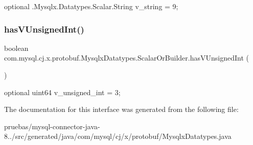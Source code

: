 {\ttfamily optional .Mysqlx.\+Datatypes.\+Scalar.\+String v\+\_\+string = 9;} \mbox{\label{interfacecom_1_1mysql_1_1cj_1_1x_1_1protobuf_1_1_mysqlx_datatypes_1_1_scalar_or_builder_a90769b1f811e80e2769df5e7c6b87221}} 
\subsubsection{\texorpdfstring{has\+V\+Unsigned\+Int()}{hasVUnsignedInt()}}
{\footnotesize\ttfamily boolean com.\+mysql.\+cj.\+x.\+protobuf.\+Mysqlx\+Datatypes.\+Scalar\+Or\+Builder.\+has\+V\+Unsigned\+Int (\begin{DoxyParamCaption}{ }\end{DoxyParamCaption})}

{\ttfamily optional uint64 v\+\_\+unsigned\+\_\+int = 3;} 

The documentation for this interface was generated from the following file\+:\begin{DoxyCompactItemize}
\item 
pruebas/mysql-\/connector-\/java-\/8../src/generated/java/com/mysql/cj/x/protobuf/Mysqlx\+Datatypes.\+java\end{DoxyCompactItemize}
